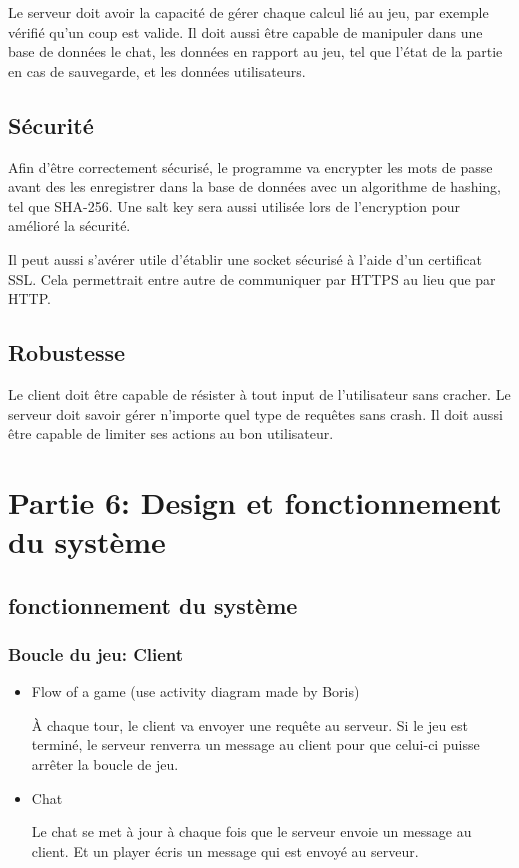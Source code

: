 Le serveur doit avoir la capacité de gérer chaque calcul lié au jeu, par exemple vérifié qu'un coup est valide. Il doit aussi être capable
de manipuler dans une base de données le chat, les données en rapport au jeu, tel que l'état de la partie en cas de sauvegarde, et les 
données utilisateurs.

\subsection{Sécurité}
Afin d'être correctement sécurisé, le programme va encrypter les mots de passe avant des les enregistrer dans la base de données avec un
algorithme de hashing, tel que SHA-256. Une salt key sera aussi utilisée lors de l'encryption pour amélioré la sécurité.

Il peut aussi s'avérer utile d'établir une socket sécurisé à l'aide d'un certificat SSL. Cela permettrait entre autre de communiquer par HTTPS au
lieu que par HTTP.

\subsection{Robustesse}
Le client doit être capable de résister à tout input de l'utilisateur sans cracher.
Le serveur doit savoir gérer n'importe quel type de requêtes sans crash. Il doit aussi être capable de limiter ses actions au bon utilisateur.

\section{Partie 6: Design et fonctionnement du système}
\subsection{fonctionnement du système}
\subsubsection{Boucle du jeu: Client}
\begin{itemize}
    \item Flow of a game (use activity diagram made by Boris)

        À chaque tour, le client va envoyer une requête au serveur. Si le jeu est terminé, le serveur renverra un message au client pour que
        celui-ci puisse arrêter la boucle de jeu.
    \item Chat

        Le chat se met à jour à chaque fois que le serveur envoie un message au client. Et un player écris un message qui est envoyé au serveur.
\end{itemize}
